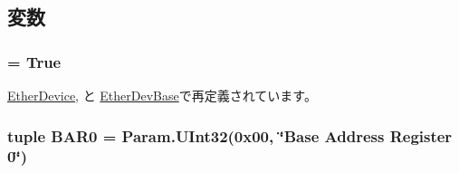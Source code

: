 \subsection{変数}
\hypertarget{classPci_1_1PciDevice_a17fa61ac3806b481cafee5593b55e5d0}{
\subsubsection[{abstract}]{ = True}}
\label{classPci_1_1PciDevice_a17fa61ac3806b481cafee5593b55e5d0}


\hyperlink{classEthernet_1_1EtherDevice_a17fa61ac3806b481cafee5593b55e5d0}{EtherDevice}, と \hyperlink{classEthernet_1_1EtherDevBase_a17fa61ac3806b481cafee5593b55e5d0}{EtherDevBase}で再定義されています。\hypertarget{classPci_1_1PciDevice_a60fb126d4d1fa61ee963a802485a62b3}{
\subsubsection[{BAR0}]{\setlength{\rightskip}{0pt plus 5cm}tuple {\bf BAR0} = Param.UInt32(0x00, \char`\"{}Base Address Register 0\char`\"{})}}
\label{classPci_1_1PciDevice_a60fb126d4d1fa61ee963a802485a62b3}


